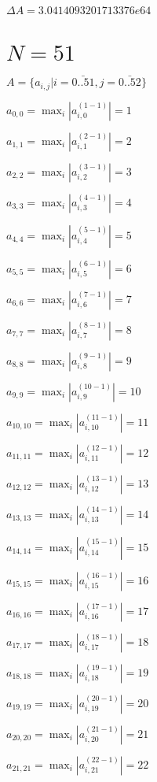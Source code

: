 \documentclass[a4paper,12pt]{article}
\begin{document}
$\Delta A = 3.0414093201713376e64$



\section{ $N = 51$ }
$A = \{ a _{ i, j } | i = \bar { 0..51 }, j = \bar { 0..52 } \}$

$a _{ 0, 0 } =  \max _i |a _{ i, 0 } ^{ (1 - 1) } | = 1$

$a _{ 1, 1 } =  \max _i |a _{ i, 1 } ^{ (2 - 1) } | = 2$

$a _{ 2, 2 } =  \max _i |a _{ i, 2 } ^{ (3 - 1) } | = 3$

$a _{ 3, 3 } =  \max _i |a _{ i, 3 } ^{ (4 - 1) } | = 4$

$a _{ 4, 4 } =  \max _i |a _{ i, 4 } ^{ (5 - 1) } | = 5$

$a _{ 5, 5 } =  \max _i |a _{ i, 5 } ^{ (6 - 1) } | = 6$

$a _{ 6, 6 } =  \max _i |a _{ i, 6 } ^{ (7 - 1) } | = 7$

$a _{ 7, 7 } =  \max _i |a _{ i, 7 } ^{ (8 - 1) } | = 8$

$a _{ 8, 8 } =  \max _i |a _{ i, 8 } ^{ (9 - 1) } | = 9$

$a _{ 9, 9 } =  \max _i |a _{ i, 9 } ^{ (10 - 1) } | = 10$

$a _{ 10, 10 } =  \max _i |a _{ i, 10 } ^{ (11 - 1) } | = 11$

$a _{ 11, 11 } =  \max _i |a _{ i, 11 } ^{ (12 - 1) } | = 12$

$a _{ 12, 12 } =  \max _i |a _{ i, 12 } ^{ (13 - 1) } | = 13$

$a _{ 13, 13 } =  \max _i |a _{ i, 13 } ^{ (14 - 1) } | = 14$

$a _{ 14, 14 } =  \max _i |a _{ i, 14 } ^{ (15 - 1) } | = 15$

$a _{ 15, 15 } =  \max _i |a _{ i, 15 } ^{ (16 - 1) } | = 16$

$a _{ 16, 16 } =  \max _i |a _{ i, 16 } ^{ (17 - 1) } | = 17$

$a _{ 17, 17 } =  \max _i |a _{ i, 17 } ^{ (18 - 1) } | = 18$

$a _{ 18, 18 } =  \max _i |a _{ i, 18 } ^{ (19 - 1) } | = 19$

$a _{ 19, 19 } =  \max _i |a _{ i, 19 } ^{ (20 - 1) } | = 20$

$a _{ 20, 20 } =  \max _i |a _{ i, 20 } ^{ (21 - 1) } | = 21$

$a _{ 21, 21 } =  \max _i |a _{ i, 21 } ^{ (22 - 1) } | = 22$
\end{document}
